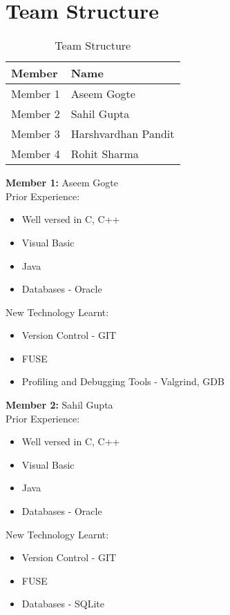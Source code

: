 \section{Team Structure}

\begin{table}[h]
\begin{center}
\begin{tabular}{|p{3cm}|p{3cm}|}
\hline
\textbf{Member} & \textbf{Name} \\ \hline
Member 1 & Aseem Gogte \\
Member 2 & Sahil Gupta\\
Member 3 & Harshvardhan Pandit \\
Member 4 & Rohit Sharma \\
\hline
\end{tabular}
\caption{Team Structure}
\end{center}
\label{tag:TS}
\end{table}

\noindent \textbf{Member 1:} Aseem Gogte \\
Prior Experience:
\begin{itemize}
\item Well versed in C, C++
\item Visual Basic
\item Java
\item Databases - Oracle
\end{itemize}
New Technology Learnt:
\begin{itemize}
\item Version Control - GIT
\item FUSE
\item Profiling and Debugging Tools - Valgrind, GDB
\end{itemize}

\noindent \textbf{Member 2:} Sahil Gupta \\
Prior Experience:
\begin{itemize}
\item Well versed in C, C++
\item Visual Basic
\item Java
\item Databases - Oracle
\end{itemize}
New Technology Learnt:
\begin{itemize}
\item Version Control - GIT
\item FUSE
\item Databases - SQLite
\end{itemize}

